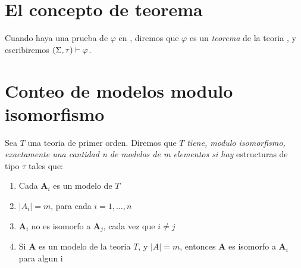 \section{El concepto de teorema}
\begin{definition}
  Cuando haya una prueba de $\varphi$ en \forder, diremos que $\varphi$ es un \emph{teorema} de la teoria \forder, y escribiremos $(\Sigma,\tau)\vdash\varphi$.
\end{definition}

\section{Conteo de modelos modulo isomorfismo}
\begin{definition}
  Sea $T$ una teoria de primer orden. Diremos que $T$ \emph{tiene, modulo isomorfismo, exactamente una 
  cantidad n de modelos de m elementos si hay } estructuras de tipo $\tau$ tales que:
  \begin{enumerate}
    \item Cada $\mathbf{A}_i$ es un modelo de $T$
    \item $|A_i| = m$, para cada $i=1,\dots,n$
    \item $\mathbf{A}_i$ no es isomorfo a $\mathbf{A}_j$, cada vez que $i\neq j$
    \item Si $\mathbf{A}$ es un modelo de la teoria $T$, y $|A| = m$, entonces $\mathbf{A}$ es isomorfo a $\mathbf{A}_i$ para algun i
  \end{enumerate} 
\end{definition}

